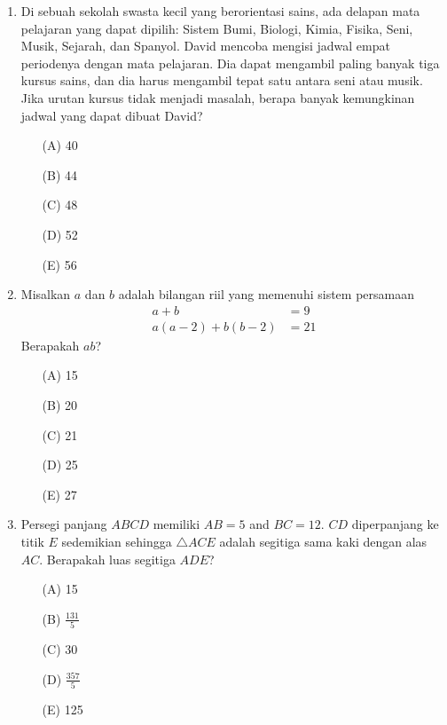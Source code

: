 \documentclass[10pt]{article}
\begin{document}
\begin{enumerate}
    \item Di sebuah sekolah swasta kecil yang berorientasi sains, ada delapan mata pelajaran yang dapat dipilih: Sistem Bumi, Biologi, Kimia, Fisika, Seni, Musik, Sejarah, dan Spanyol. David mencoba mengisi jadwal empat periodenya dengan mata pelajaran. Dia dapat mengambil paling banyak tiga kursus sains, dan dia harus mengambil tepat satu antara seni atau musik. Jika urutan kursus tidak menjadi masalah, berapa banyak kemungkinan jadwal yang dapat dibuat David?
    \begin{itemize}
        \item[(A)] 40
        \item[(B)] 44
        \item[(C)] 48
        \item[(D)] 52
        \item[(E)] 56
    \end{itemize}

    \item Misalkan $a$ dan $b$ adalah bilangan riil yang memenuhi sistem persamaan
    \begin{align*}
    a+b &= 9 \\
    a(a-2)+b(b-2) &= 21
    \end{align*}
    Berapakah $ab$?
    \begin{itemize}
        \item[(A)] 15
        \item[(B)] 20
        \item[(C)] 21
        \item[(D)] 25
        \item[(E)] 27
    \end{itemize}

    \item Persegi panjang $ABCD$ memiliki $AB=5$ and $BC=12$. $CD$ diperpanjang ke titik $E$ sedemikian sehingga $\triangle ACE$ adalah segitiga sama kaki dengan alas $AC$. Berapakah luas segitiga $ADE$?
    \begin{itemize}
        \item[(A)] 15
        \item[(B)] $\frac{131}{5}$
        \item[(C)] 30
        \item[(D)] $\frac{357}{5}$
        \item[(E)] 125
    \end{itemize}


\end{enumerate}
\end{document}
